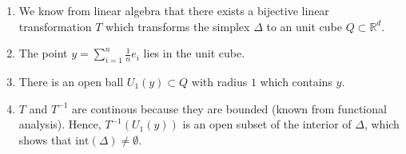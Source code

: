 \documentclass{article}
\begin{document}
\begin{enumerate}
    \item We know from linear algebra that there exists a bijective linear transformation $T$ which transforms the simplex $\Delta$ to an unit cube $Q \subset \mathbb R^d$.
    \item The point $y = \sum^n_{i=1}\frac{1}{n}e_i$ lies in the unit cube.
    \item There is an open ball $U_1(y) \subset Q$ with radius $1$ which contains $y$.
    \item $T$ and $T^{-1}$ are continous because they are bounded (known from functional analysis). Hence, $T^{-1}(U_1(y))$ is an open subset of the interior of $\Delta$, which shows that $\mathrm{int}(\Delta)\neq \emptyset$.
\end{enumerate}

\end{document}
